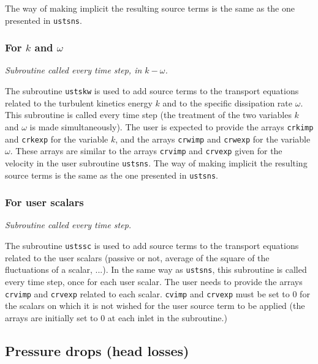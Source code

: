 {{{The way of making implicit the resulting source terms is the same as the
one presented in \texttt{ustsns}.

\subsubsection{For $k$ and $\omega$}

\noindent
\textit{Subroutine called every time step, in $k-\omega$.}

The subroutine \texttt{ustskw} is used to add source terms to the transport equations
related to the turbulent kinetics energy $k$ and to the specific
dissipation rate $\omega$. This subroutine is
called every time step (the treatment of the two
variables $k$ and $\omega$ is made simultaneously). The user is expected
to provide the arrays \texttt{crkimp} and \texttt{crkexp} for the variable
$k$, and the arrays \texttt{crwimp} and \texttt{crwexp} for the variable $\omega$.
These arrays are similar to the arrays \texttt{crvimp} and \texttt{crvexp}
given for the velocity in the user subroutine \texttt{ustsns}. The way of
making implicit the resulting source terms is the same as the one presented in
\texttt{ustsns}.

\subsubsection{For user scalars}

\noindent
\textit{Subroutine called every time step.}

The subroutine \texttt{ustssc} is used to add source terms to the transport equations
related to the user scalars (passive or not, average of the square of
the fluctuations of a scalar, ...). In the same way as
\texttt{ustsns}, this subroutine is called every time step, once for
each user scalar. The user needs to provide the arrays \texttt{crvimp}
and \texttt{crvexp} related to each scalar. \texttt{cvimp} and \texttt{crvexp}
must be set to 0 for the scalars on which it is not wished for the user source
term to be applied (the arrays are initially set to 0 at each inlet in the subroutine.)

\subsection{Pressure drops (head losses)}

}}}
